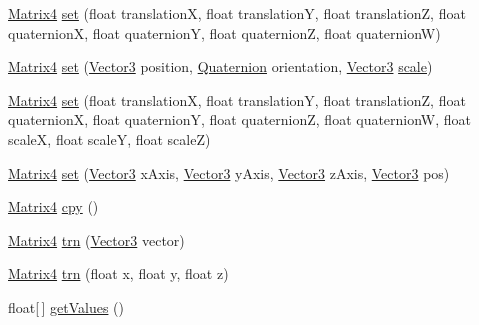 \begin{DoxyCompactItemize}
\item 
\hyperlink{classairhockeyjava_1_1util_1_1_matrix4}{Matrix4} \hyperlink{classairhockeyjava_1_1util_1_1_matrix4_aca2eb2ed4c414e598205864b9f809589}{set} (float translation\+X, float translation\+Y, float translation\+Z, float quaternion\+X, float quaternion\+Y, float quaternion\+Z, float quaternion\+W)
\item 
\hyperlink{classairhockeyjava_1_1util_1_1_matrix4}{Matrix4} \hyperlink{classairhockeyjava_1_1util_1_1_matrix4_a7f81a577a0f7aaa097dafc68c56aebd0}{set} (\hyperlink{classairhockeyjava_1_1util_1_1_vector3}{Vector3} position, \hyperlink{classairhockeyjava_1_1util_1_1_quaternion}{Quaternion} orientation, \hyperlink{classairhockeyjava_1_1util_1_1_vector3}{Vector3} \hyperlink{classairhockeyjava_1_1util_1_1_matrix4_a6c40d2aa19b65cdc8749121b126a6940}{scale})
\item 
\hyperlink{classairhockeyjava_1_1util_1_1_matrix4}{Matrix4} \hyperlink{classairhockeyjava_1_1util_1_1_matrix4_aadfa180c60c867521340e68fe270d535}{set} (float translation\+X, float translation\+Y, float translation\+Z, float quaternion\+X, float quaternion\+Y, float quaternion\+Z, float quaternion\+W, float scale\+X, float scale\+Y, float scale\+Z)
\item 
\hyperlink{classairhockeyjava_1_1util_1_1_matrix4}{Matrix4} \hyperlink{classairhockeyjava_1_1util_1_1_matrix4_a6836f23705389a2df10ba869067118d8}{set} (\hyperlink{classairhockeyjava_1_1util_1_1_vector3}{Vector3} x\+Axis, \hyperlink{classairhockeyjava_1_1util_1_1_vector3}{Vector3} y\+Axis, \hyperlink{classairhockeyjava_1_1util_1_1_vector3}{Vector3} z\+Axis, \hyperlink{classairhockeyjava_1_1util_1_1_vector3}{Vector3} pos)
\item 
\hyperlink{classairhockeyjava_1_1util_1_1_matrix4}{Matrix4} \hyperlink{classairhockeyjava_1_1util_1_1_matrix4_ae4fe30dbb0eeeb228c1140b967a50d45}{cpy} ()
\item 
\hyperlink{classairhockeyjava_1_1util_1_1_matrix4}{Matrix4} \hyperlink{classairhockeyjava_1_1util_1_1_matrix4_aa56444ce42d35befa98bf63a99462e24}{trn} (\hyperlink{classairhockeyjava_1_1util_1_1_vector3}{Vector3} vector)
\item 
\hyperlink{classairhockeyjava_1_1util_1_1_matrix4}{Matrix4} \hyperlink{classairhockeyjava_1_1util_1_1_matrix4_a0f4c8afd82e3178462676e77eac23cc3}{trn} (float x, float y, float z)
\item 
float\mbox{[}$\,$\mbox{]} \hyperlink{classairhockeyjava_1_1util_1_1_matrix4_a6fd916910fcb3bdb5be2680713863c18}{get\+Values} ()
\item 

\end{DoxyCompactItemize}
